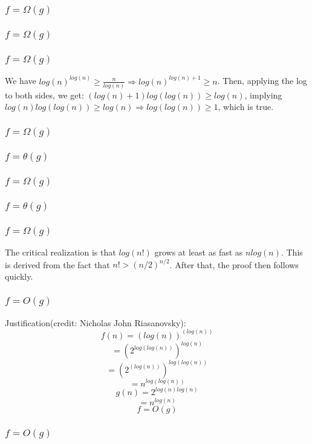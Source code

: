 \documentclass{article}
\begin{document}
\subsubsection{$f = \Omega(g)$}
\subsubsection{$f = \Omega(g)$}
\subsubsection{$f = \Omega(g)$}
We have $log(n)^{log(n)} \geq \frac{n}{log(n)} \Rightarrow log(n)^{log(n) + 1} \geq n$. Then, applying the log to both sides, we get: $(log(n) + 1)log(log(n)) \geq log(n)$, implying $log(n)log(log(n)) \geq log(n) \Rightarrow log(log(n)) \geq 1$, which is true. 
\subsubsection{$f = \Omega(g)$}
\subsubsection{$f = \theta(g)$}
\subsubsection{$f = \Omega(g)$}
\subsubsection{$f = \theta(g)$}
\subsubsection{$f = \Omega(g)$}
The critical realization is that $log(n!)$ grows at least as fast as $nlog(n)$. This is derived from the fact that $n! > (n/2)^{n/2}$. After that, the proof then follows quickly. 
\subsubsection{$f = O(g)$}
Justification(credit: Nicholas John Riasanovsky): 
$$f(n)=(log(n))^{(log(n))}$$
$$=(2^{log(log(n))})^{log(n)}$$
$$=(2^{(log(n))})^{log(log(n))}$$
$$=n^{log(log(n))}$$
$$g(n)=2^{log(n)log(n)}$$
$$=n^{log(n)}$$
$$f=O(g)$$
\subsubsection{$f = O(g)$}
\subsection{}
\end{document}
